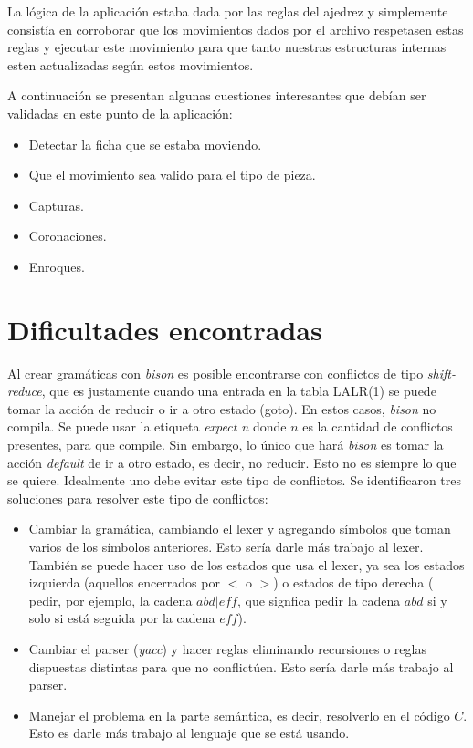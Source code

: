 \documentclass[a4paper,10pt]{article}
\begin{document}
La lógica de la aplicación estaba dada por las reglas del ajedrez y simplemente consistía en corroborar que los movimientos dados
por el archivo respetasen estas reglas y ejecutar este movimiento para que tanto nuestras estructuras internas esten actualizadas 
según estos movimientos.

A continuación se presentan algunas cuestiones interesantes que debían ser validadas en este punto de la aplicación:
\begin{itemize}
 \item Detectar la ficha que se estaba moviendo.
 \item Que el movimiento sea valido para el tipo de pieza.
 \item Capturas.
 \item Coronaciones.
 \item Enroques.
\end{itemize}


\newpage

\section{Dificultades encontradas}

Al crear gramáticas con \textit{bison}  es posible encontrarse con conflictos de tipo \textit{shift-reduce}, que es justamente cuando una entrada 
en la tabla LALR(1) se puede tomar la acción de reducir o ir a otro estado (goto). En estos casos, \textit{bison} no compila. Se puede usar la 
etiqueta \textit{expect n} donde $n$ es la cantidad de conflictos presentes, para que compile. Sin embargo, lo único que hará \textit{bison} es tomar 
la acción \textit{default}  de ir a otro estado, es decir, no reducir. Esto no es siempre lo que se quiere. Idealmente uno debe evitar este tipo de 
conflictos. Se identificaron tres soluciones para resolver este tipo de conflictos:
\begin{itemize}
\item Cambiar la gramática, cambiando el lexer y agregando símbolos que toman varios de los símbolos anteriores. Esto sería darle más trabajo al lexer.
También  se puede hacer uso de los estados que usa el lexer, ya sea los estados izquierda (aquellos encerrados por $<$ o $>$) o estados de tipo derecha (
pedir, por ejemplo, la cadena $abd|eff$, que signfica pedir la cadena $abd$ si y solo si está seguida por la cadena $eff$). 
\item Cambiar el parser (\textit{yacc}) y hacer reglas eliminando recursiones  o reglas dispuestas distintas para que no conflictúen. Esto sería darle 
más trabajo al parser.
\item Manejar el problema en la parte semántica, es decir, resolverlo en el código $C$. Esto es darle más trabajo al lenguaje que se está usando.
\end{itemize}
\end{document}
